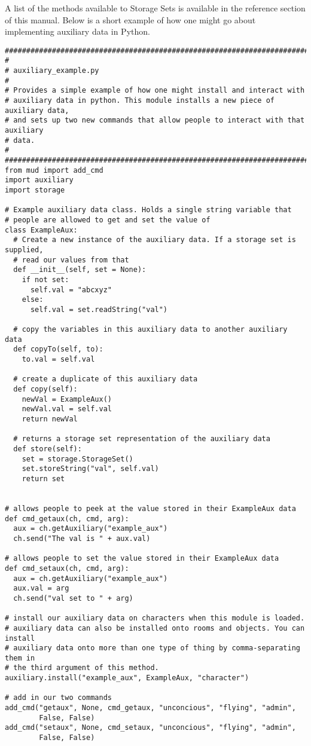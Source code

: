 \documentclass[12pt]{article}
\begin{document}
A list of the methods available to Storage Sets is available in the reference section of this manual. Below is a short example of how one might go about implementing auxiliary data in Python. 

{\bf \begin{verbatim}
###############################################################################
#
# auxiliary_example.py
#
# Provides a simple example of how one might install and interact with 
# auxiliary data in python. This module installs a new piece of auxiliary data,
# and sets up two new commands that allow people to interact with that auxiliary
# data.
#
###############################################################################
from mud import add_cmd
import auxiliary
import storage

# Example auxiliary data class. Holds a single string variable that
# people are allowed to get and set the value of
class ExampleAux:
  # Create a new instance of the auxiliary data. If a storage set is supplied,
  # read our values from that
  def __init__(self, set = None):
    if not set:
      self.val = "abcxyz"
    else:
      self.val = set.readString("val")

  # copy the variables in this auxiliary data to another auxiliary data
  def copyTo(self, to):
    to.val = self.val

  # create a duplicate of this auxiliary data
  def copy(self):
    newVal = ExampleAux()
    newVal.val = self.val
    return newVal

  # returns a storage set representation of the auxiliary data
  def store(self):
    set = storage.StorageSet()
    set.storeString("val", self.val)
    return set


# allows people to peek at the value stored in their ExampleAux data
def cmd_getaux(ch, cmd, arg):
  aux = ch.getAuxiliary("example_aux")
  ch.send("The val is " + aux.val)

# allows people to set the value stored in their ExampleAux data
def cmd_setaux(ch, cmd, arg):
  aux = ch.getAuxiliary("example_aux")
  aux.val = arg
  ch.send("val set to " + arg)

# install our auxiliary data on characters when this module is loaded.
# auxiliary data can also be installed onto rooms and objects. You can install
# auxiliary data onto more than one type of thing by comma-separating them in
# the third argument of this method.
auxiliary.install("example_aux", ExampleAux, "character")

# add in our two commands
add_cmd("getaux", None, cmd_getaux, "unconcious", "flying", "admin",
        False, False)
add_cmd("setaux", None, cmd_setaux, "unconcious", "flying", "admin",
        False, False)
\end{verbatim}}
\end{document}
